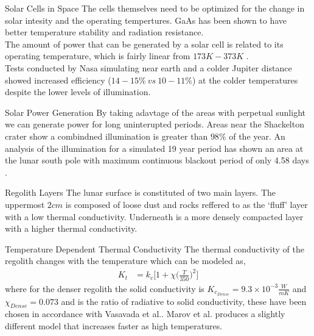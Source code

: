 \documentclass{beamer}
\begin{document}
\begin{frame}{Solar Cells in Space}
The cells themselves need to be optimized for the change in solar intesity and the operating tempertures. GaAs has been shown to have better temperature stability and radiation resistance\cite{Mcevoy}.\\
The amount of power that can be generated by a solar cell is related to its operating temperature, which is fairly linear from $173 K - 373K$ \cite{Mcevoy}.\\ Tests conducted by Nasa simulating near earth and a colder Jupiter distance showed increased efficiency ($14-15\%\ vs\ 10-11\%  $) at the colder temperatures despite the lower levels of illumination\cite{Liebert}.
\end{frame}

\begin{frame}{Solar Power Generation}
By taking adavtage of the areas with perpetual sunlight we can generate power for long uninterupted periods. Areas near the Shackelton crater show a combindned illumination is greater than $98 \% $ of the year\cite{Bussey}. An analysis of the illumination for a simulated 19 year period has shown an area at the lunar south pole with maximum continuous blackout period of only 4.58 days \cite{Mazarico}.  
\end{frame}


\begin{frame}{Regolith Layers}
The lunar surface is constituted of two main layers. The uppermost $2cm$ is composed of loose dust and rocks reffered to as the `fluff' layer with a low thermal conductivity. Underneath is a more densely compacted layer with a higher thermal conductivity\cite{Malla}.
\end{frame}


\begin{frame}{Temperature Dependent Thermal Conductivity}
The thermal conductivity of the regolith changes with the temperature which can be modeled as,
\begin{align*}
K_t & = k_c \Bigg [ 1+\chi \bigg ( \frac{T}{350} \bigg )^2  \bigg ]
\end{align*}
where for the denser regolith the solid conductivity is $K_{c_{Dense}} = 9.3\times 10^{-3} \frac{W}{mK}$ and $\chi_{Dense}= 0.073$ and is the ratio of radiative to solid conductivity, these have been chosen in accordance with Vasavada et al.\cite{Vasavada}. Marov et al. produces a slightly different model that increases faster as high temperatures.
\end{frame}
\end{document}
